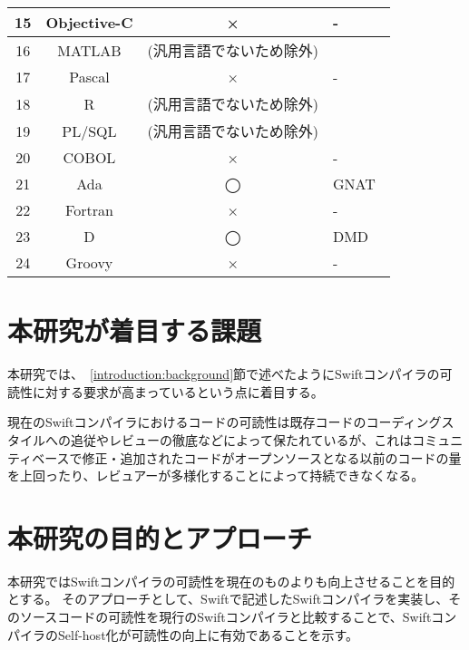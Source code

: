 \begin{table}[hb]
\begin{center}
\begin{tabular}{|c|c|c|m{4.5cm}|}
            \hline
            15 & Objective-C & × & -\\
            \hline
            16 & MATLAB & (汎用言語でないため除外) &\\
            \hline
            17 & Pascal & × & -\\
            \hline
            18 & R & (汎用言語でないため除外) &\\
            \hline
            19 & PL/SQL & (汎用言語でないため除外) &\\
            \hline
            20 & COBOL & × & -\\
            \hline
            21 & Ada & ◯ & GNAT~\cite{gnat}\\
            \hline
            22 & Fortran & × & -\\
            \hline
            23 & D & ◯ & DMD~\cite{dmd}\\
            \hline
            24 & Groovy & × & -\\
            \hline
        \end{tabular}
        \label{table:bootstrapping-languages}
    \end{center}
\end{table}


\section{本研究が着目する課題}
\label{introduction:issue}

本研究では、~\ref{introduction:background}節で述べたようにSwiftコンパイラの可読性に対する要求が高まっているという点に着目する。

現在のSwiftコンパイラにおけるコードの可読性は既存コードのコーディングスタイルへの追従やレビューの徹底などによって保たれているが、これはコミュニティベースで修正・追加されたコードがオープンソースとなる以前のコードの量を上回ったり、レビュアーが多様化することによって持続できなくなる。


\section{本研究の目的とアプローチ}
\label{introduction:purpose}

本研究ではSwiftコンパイラの可読性を現在のものよりも向上させることを目的とする。
そのアプローチとして、Swiftで記述したSwiftコンパイラを実装し、そのソースコードの可読性を現行のSwiftコンパイラと比較することで、SwiftコンパイラのSelf-host化が可読性の向上に有効であることを示す。


